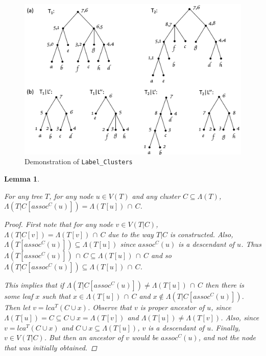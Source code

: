 \documentclass{article}
\newcommand{\leafset}{\Lambda}
\newtheorem{assocnode}[incompatibility]{Lemma}
\begin{document}
    \begin{figure}[h]
        \includegraphics[scale=0.5]{labelclusters}
        \centering
        \caption{Demonstration of \texttt{Label\_Clusters}}
        \label{fig:labelclusters}
    \end{figure}

    \bigskip
    \begin{assocnode}
        \label{lem:assocnode}

        For any tree $T$, for any node $u \in V(T)$ and any cluster $C \subseteq \leafset(T)$, $\leafset(T|C[assoc^C(u)]) = \leafset(T[u])\, \cap\, C$.

        \begin{proof}
            First note that for any node $v \in V(T|C)$, $\leafset(T|C[v]) = \leafset(T[v])\, \cap\, C$ due to the way $T|C$ is constructed. Also, $\leafset(T[assoc^C(u)]) \subseteq \leafset(T[u])$ since $assoc^C(u)$ is a descendant of $u$. Thus $\leafset(T[assoc^C(u)])\, \cap\, C \subseteq \leafset(T[u])\, \cap\, C$ and so $\leafset(T|C[assoc^C(u)]) \subseteq \leafset(T[u])\, \cap\, C$.

            This implies that if $\leafset(T|C[assoc^C(u)]) \neq \leafset(T[u])\, \cap\, C$ then there is some leaf $x$ such that $x \in \leafset(T[u])\, \cap\, C$ and $x \not\in \leafset(T|C[assoc^C(u)])$. Then let $v = lca^T(C \cup x)$. Observe that $v$ is proper ancestor of $u$, since $\leafset(T[u]) = C \subseteq C \cup x = \leafset(T[v])$ and $\leafset(T[u]) \neq \leafset(T[v])$. Also, since $v = lca^T(C \cup x)$ and $C \cup x \subseteq \leafset(T[u])$, $v$ is a descendant of $u$. Finally, $v \in V(T|C)$. But then an ancestor of $v$ would be $assoc^C(u)$, and not the node that was initially obtained.
        \end{proof}
    \end{assocnode}
\end{document}
